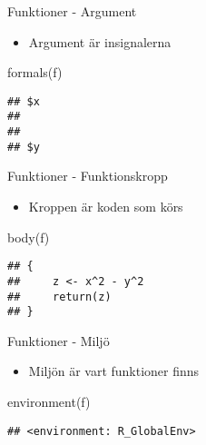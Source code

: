 \documentclass[
  11pt,
  ignorenonframetext,
]{beamer}
\newenvironment{Shaded}{\begin{snugshade}}{\end{snugshade}}
\newcommand{\FunctionTok}[1]{\textcolor[rgb]{0.00,0.00,0.00}{#1}}
\newcommand{\NormalTok}[1]{#1}
\providecommand{\tightlist}{%
  \setlength{\itemsep}{0pt}\setlength{\parskip}{0pt}}
\begin{document}
\begin{frame}[fragile]{Funktioner - Argument}
\protect\hypertarget{funktioner---argument}{}
\begin{itemize}
\tightlist
\item
  Argument är insignalerna
\end{itemize}

\begin{Shaded}
\begin{Highlighting}[]
\FunctionTok{formals}\NormalTok{(f)}
\end{Highlighting}
\end{Shaded}

\begin{verbatim}
## $x
## 
## 
## $y
\end{verbatim}
\end{frame}

\begin{frame}[fragile]{Funktioner - Funktionskropp}
\protect\hypertarget{funktioner---funktionskropp}{}
\begin{itemize}
\tightlist
\item
  Kroppen är koden som körs
\end{itemize}

\begin{Shaded}
\begin{Highlighting}[]
\FunctionTok{body}\NormalTok{(f)}
\end{Highlighting}
\end{Shaded}

\begin{verbatim}
## {
##     z <- x^2 - y^2
##     return(z)
## }
\end{verbatim}
\end{frame}

\begin{frame}[fragile]{Funktioner - Miljö}
\protect\hypertarget{funktioner---miljuxf6}{}
\begin{itemize}
\tightlist
\item
  Miljön är vart funktioner finns
\end{itemize}

\begin{Shaded}
\begin{Highlighting}[]
\FunctionTok{environment}\NormalTok{(f)}
\end{Highlighting}
\end{Shaded}

\begin{verbatim}
## <environment: R_GlobalEnv>
\end{verbatim}
\end{frame}
\end{document}
